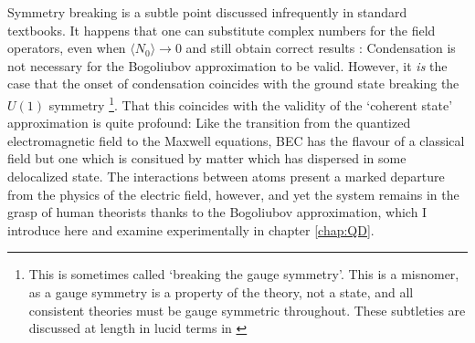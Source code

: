 	Symmetry breaking is a subtle point discussed infrequently in standard textbooks. It happens that one can substitute complex numbers for the field operators,  even when $\langle N_0\rangle \rightarrow 0$ and still obtain correct results \cite{ginibre67}: Condensation is not necessary for the Bogoliubov approximation to be valid. However, it \emph{is} the case that the onset of condensation coincides with the ground state breaking the $U(1)$ symmetry \cite{suto05} \footnote{This is sometimes called `breaking the gauge symmetry'. This is a misnomer, as a gauge symmetry is a property of the theory, not a state, and all consistent theories must be gauge symmetric throughout. These subtleties are discussed at length in lucid terms in \cite{poniatowski19}}. That this coincides with the validity of the `coherent state' approximation is quite profound: Like the transition from the quantized electromagnetic field to the Maxwell equations, BEC has the flavour of a classical field but one which is consitued by matter which has dispersed in some delocalized state. The interactions between atoms present a marked departure from the physics of the electric field, however, and yet the system remains in the grasp of human theorists thanks to the Bogoliubov approximation, which I introduce here and examine experimentally in chapter \ref{chap:QD}.


	
